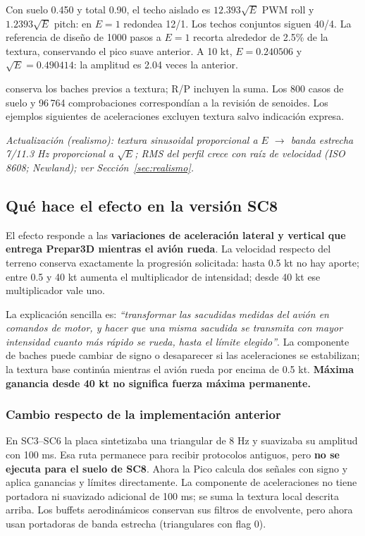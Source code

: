 \documentclass[11pt,a4paper]{article}
\newcommand{\code}[1]{\texttt{\detokenize{#1}}}
\begin{document}
Con suelo 0.450 y total 0.90, el techo aislado es $12.393\sqrt E$ PWM roll y $1.2393\sqrt E$ pitch: en $E=1$ redondea 12/1. Los techos conjuntos siguen 40/4. La referencia de diseño de 1000 pasos a $E=1$ recorta alrededor de 2.5\% de la textura, conservando el pico suave anterior. A 10 kt, $E=0.240506$ y $\sqrt E=0.490414$: la amplitud es 2.04 veces la anterior.

\code{gr/gp} conserva los baches previos a textura; R/P incluyen la suma. Los 800 casos de suelo y 96\,764 comprobaciones correspondían a la revisión de senoides. Los ejemplos siguientes de aceleraciones excluyen textura salvo indicación expresa.

\textit{Actualización (realismo): textura sinusoidal proporcional a $E$ $\rightarrow$ banda estrecha 7/11.3 Hz proporcional a $\sqrt E$; RMS del perfil crece con raíz de velocidad (ISO 8608; Newland); ver Sección~\ref{sec:realismo}.}

\subsection{Qué hace el efecto en la versión SC8}
El efecto responde a las \textbf{variaciones de aceleración lateral y vertical que entrega Prepar3D mientras el avión rueda}. La velocidad respecto del terreno conserva exactamente la progresión solicitada: hasta 0.5 kt no hay aporte; entre 0.5 y 40 kt aumenta el multiplicador de intensidad; desde 40 kt ese multiplicador vale uno.

La explicación sencilla es: \emph{``transformar las sacudidas medidas del avión en comandos de motor, y hacer que una misma sacudida se transmita con mayor intensidad cuanto más rápido se rueda, hasta el límite elegido''}. La componente de baches puede cambiar de signo o desaparecer si las aceleraciones se estabilizan; la textura base continúa mientras el avión rueda por encima de 0.5 kt. \textbf{Máxima ganancia desde 40 kt no significa fuerza máxima permanente.}

\subsubsection{Cambio respecto de la implementación anterior}
En SC3--SC6 la placa sintetizaba una triangular de 8 Hz y suavizaba su amplitud con 100 ms. Esa ruta permanece para recibir protocolos antiguos, pero \textbf{no se ejecuta para el suelo de SC8}. Ahora la Pico calcula dos señales con signo y aplica ganancias y límites directamente. La componente de aceleraciones no tiene portadora ni suavizado adicional de 100 ms; se suma la textura local descrita arriba. Los buffets aerodinámicos conservan sus filtros de envolvente, pero ahora usan portadoras de banda estrecha (triangulares con flag 0).
\end{document}
